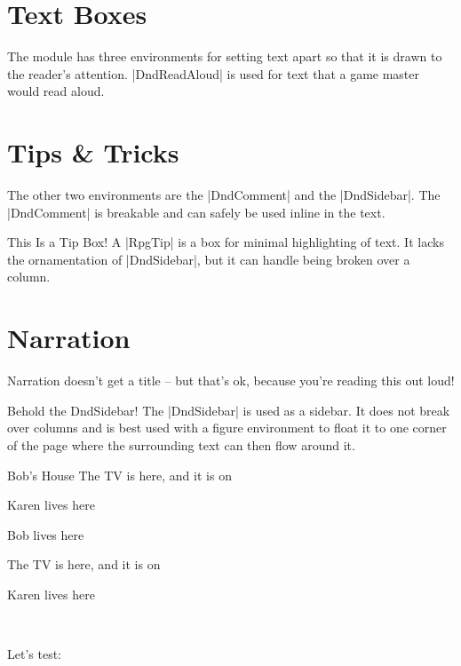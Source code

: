 	\section{Text Boxes}

	The module has three environments for setting text apart so that it is drawn to the reader's attention. |DndReadAloud| is used for text that a game master would read aloud.
	\section{Tips \& Tricks}
	The other two environments are the |DndComment| and the |DndSidebar|. The |DndComment| is breakable and can safely be used inline in the text.

	\begin{RpgTip}{This Is a Tip Box!}
	A |RpgTip| is a box for minimal highlighting of text. It lacks the ornamentation of |DndSidebar|, but it can handle being broken over a column.
	\end{RpgTip}



	\section{Narration}

	\begin{RpgNarration}
		Narration doesn't get a title -- but that's ok, because you're reading this out loud!
	\end{RpgNarration}

	\begin{RpgSidebar}[]{Behold the DndSidebar!}
  The |DndSidebar| is used as a sidebar. It does not break over columns and is best used with a figure environment to float it to one corner of the page where the surrounding text can then flow around it.
\end{RpgSidebar}


		\begin{RpgMap*}[depth=0,title={RPG maps}]
			
			

			\begin{RpgNestedArea}[bob][prefix={Bob~}]{Bob's House}
				 The TV is here, and it is on
				\RpgArea[cot]{}
			\end{RpgNestedArea}

			 Karen lives here
			\RpgArea{}
		\end{RpgMap*}

		\begin{RpgMap}[depth=0,title={A test map}]
			
			 Bob lives here

			\begin{RpgMap}[prefix={}]
				 The TV is here, and it is on
				\RpgArea[cot]{}
			\end{RpgMap}

			 Karen lives here
			\RpgArea{}
		\end{RpgMap}
		

		~

		Let's test: 
